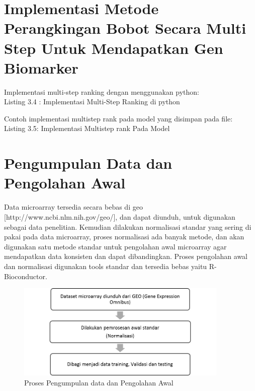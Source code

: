 \section{Implementasi Metode Perangkingan Bobot Secara Multi Step Untuk Mendapatkan Gen Biomarker}
Implementasi multi-step ranking dengan menggunakan python:\\
Listing 3.4 : Implementasi Multi-Step Ranking di python


Contoh implementasi multistep rank pada model yang disimpan pada file: \\
Listing 3.5: Implementasi Multistep rank Pada Model


\section{Pengumpulan Data dan Pengolahan Awal}
Data microarray tersedia secara bebas di geo [http://www.ncbi.nlm.nih.gov/geo/], dan dapat diunduh, untuk digunakan sebagai data penelitian. Kemudian dilakukan normalisasi standar yang sering di pakai pada data microarray, proses normalisasi ada banyak metode, dan akan digunakan satu metode standar untuk pengolahan awal microarray agar mendapatkan data konsisten dan dapat dibandingkan. Proses pengolahan awal dan normalisasi digunakan tools standar dan tersedia bebas yaitu R-Bioconductor. \\

\begin{figure}
	\centering
	\includegraphics[width=0.9\textwidth]
		{pics/bagian1.png}
	\caption{Proses Pengumpulan data dan Pengolahan Awal}
	\label{fig:pengolahan_awal}
\end{figure}


